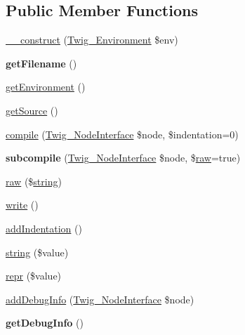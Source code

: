 \subsection*{Public Member Functions}
\begin{DoxyCompactItemize}
\item 
\hyperlink{class_twig___compiler_a4f8326243132c1450a81e0a817aa1be7}{\+\_\+\+\_\+construct} (\hyperlink{class_twig___environment}{Twig\+\_\+\+Environment} \$env)
\item 
\hypertarget{class_twig___compiler_a2982abe8d7b767602a1485dfb4cf653d}{}{\bfseries get\+Filename} ()\label{class_twig___compiler_a2982abe8d7b767602a1485dfb4cf653d}

\item 
\hyperlink{class_twig___compiler_a1a945689f9a90f9029d671ec32262d37}{get\+Environment} ()
\item 
\hyperlink{class_twig___compiler_a42fdd8313c99d9c5f80219c1e192b93a}{get\+Source} ()
\item 
\hyperlink{class_twig___compiler_af1dcaa90386feaeb7eb51d16a8951999}{compile} (\hyperlink{interface_twig___node_interface}{Twig\+\_\+\+Node\+Interface} \$node, \$indentation=0)
\item 
\hypertarget{class_twig___compiler_a8e6aa981f4b2ceaf4fc20b922acebbd6}{}{\bfseries subcompile} (\hyperlink{interface_twig___node_interface}{Twig\+\_\+\+Node\+Interface} \$node, \$\hyperlink{class_twig___compiler_ad067731c51a63ace079316e8252fff4b}{raw}=true)\label{class_twig___compiler_a8e6aa981f4b2ceaf4fc20b922acebbd6}

\item 
\hyperlink{class_twig___compiler_ad067731c51a63ace079316e8252fff4b}{raw} (\$\hyperlink{class_twig___compiler_af168408db12bfe7bb7e326a765fa085d}{string})
\item 
\hyperlink{class_twig___compiler_aa245791a86f0178986f84c9357339aab}{write} ()
\item 
\hyperlink{class_twig___compiler_a02533749d6f3f827202ed66f2d86e459}{add\+Indentation} ()
\item 
\hyperlink{class_twig___compiler_af168408db12bfe7bb7e326a765fa085d}{string} (\$value)
\item 
\hyperlink{class_twig___compiler_a6f9785d88c108c5eef3d6f946c620e66}{repr} (\$value)
\item 
\hyperlink{class_twig___compiler_a26cbbd1f0bd9186c953c5fde5180ff22}{add\+Debug\+Info} (\hyperlink{interface_twig___node_interface}{Twig\+\_\+\+Node\+Interface} \$node)
\item 
\hypertarget{class_twig___compiler_abd0ecb0136f4228db2bd963bfc1e20d7}{}{\bfseries get\+Debug\+Info} ()\label{class_twig___compiler_abd0ecb0136f4228db2bd963bfc1e20d7}


\end{DoxyCompactItemize}
